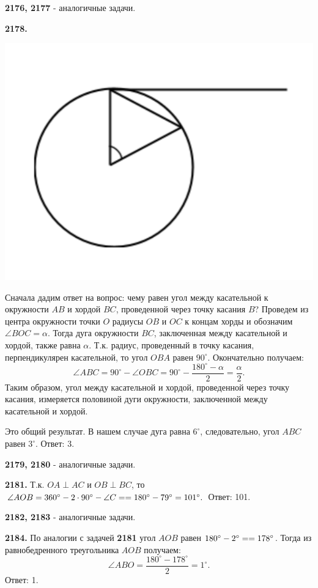 \textbf{2176, 2177} - аналогичные задачи.

\textbf{2178.}

{\centering \includegraphics[width=0.35\linewidth]{Geometry/Content/48.png}
	
}

Сначала дадим ответ на вопрос: чему равен угол между касательной к окружности $AB$ и хордой $BC$, проведенной через точку касания $B$? Проведем из центра окружности точки $O$ радиусы $OB$ и $OC$ к концам хорды и обозначим $\angle BOC=\alpha$. Тогда дуга окружности $BC$, заключенная между касательной и хордой, также равна $\alpha$. Т.к. радиус, проведенный в точку касания, перпендикулярен касательной, то угол $OBA$ равен $90^\circ$. Окончательно получаем: 
\[
\angle ABC = 90^\circ - \angle OBC = 90^\circ-\frac{180^\circ-\alpha}{2}=\frac{\alpha}{2}.
\]
Таким образом, угол между касательной и хордой, проведенной через точку касания, измеряется половиной дуги окружности, заключенной между касательной и хордой. 

Это общий результат. В нашем случае дуга равна $6^\circ$, следовательно, угол $ABC$ равен $3^\circ$. \newline \null \hspace*{\fill} Ответ: 3.

\textbf{2179, 2180} - аналогичные задачи.

\textbf{2181.} Т.к. $OA \perp AC$ и $OB \perp BC$, то $\angle AOB = 360^\circ - 2\cdot90^\circ - \angle C = \linebreak =180^\circ-79^\circ=101^\circ.$ \newline \null \hspace*{\fill} Ответ: 101.

\textbf{2182, 2183} - аналогичные задачи.

\textbf{2184.} По аналогии с задачей \textbf{2181} угол $AOB$ равен $180^\circ-2^\circ=\linebreak=178^\circ$. Тогда из равнобедренного треугольника $AOB$ получаем:
\[
\angle ABO=\frac{180^\circ-178^\circ}{2}=1^\circ.
\] \null \hspace*{\fill} Ответ: 1.

